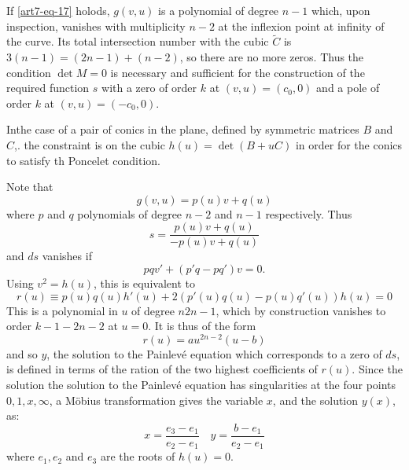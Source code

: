 If \eqref{art7-eq-17} holods, $g(v,u)$ is a polynomial of degree $n-1$ which, upon inspection, vanishes with multiplicity $n-2$ at the inflexion point at infinity of the curve. Its total intersection number with the cubic $\tilde{C}$ is $3(n-1) = (2n-1)+(n-2)$, so there are no more zeros. Thus the condition $\det M =0 $ is necessary and sufficient for the construction of the required function $s$ with a zero of order $k$ at $(v, u)=(c_{0},0)$ and a pole of order $k$ at $(v,u)= (-c_{0},0)$.

In\pageoriginale the case of a pair of conics in the plane, defined by symmetric matrices $B$ and $C$,. the constraint is on the cubic $h(u)=\det(B+uC)$ in order for the conics to satisfy th Poncelet condition.

Note that
$$
g(v,u) = p(u)v +q(u)
$$
where $p$ and $q$ polynomials of degree $n-2$ and $n-1$ respectively. Thus
$$
s = \dfrac{p(u)v + q(u)}{-p(u)v + q(u)}
$$
and $ds$ vanishes if
$$
pqv' + (p'q-pq')v=0.
$$
Using $v^{2}=h(u)$, this is equivalent to
$$
r(u)\equiv p(u)q(u)h'(u) + 2(p'(u)q(u)-p(u)q'(u))h(u)=0
$$
This is a polynomial in $u$ of degree $n2n-1$, which by construction vanishes to order $k-1-2n-2$ at $u =0$. It is thus of the form
$$
r(u)=au^{2n-2}(u-b)
$$
and so $y$, the solution to the Painlev\'e equation which corresponds to a zero
 of $ds$, is defined in terms of the ration of the two highest coefficients of $r(u)$. Since the solution the solution to the Painlev\'e equation has singularities at the four points $0,1,x, \infty$, a M\"obius transformation gives the variable $x$, and the solution $y(x)$, as:
 \begin{equation*}\label{art7-eq-18}
x= \dfrac{e_{3}-e_{1}}{e_{2}-e_{1}} \quad y=\dfrac{b-e_{1}}{e_{2}-e_{1}}\tag{18}
 \end{equation*}   
where $e_{1}, e_{2}$ and $e_{3}$ are the roots of $h(u)=0$.

